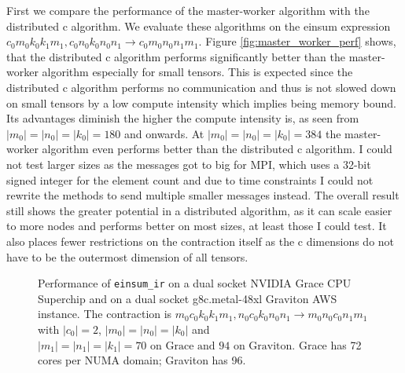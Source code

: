First we compare the performance of the master-worker algorithm with the distributed c algorithm.
We evaluate these algorithms on the einsum expression $c_0m_0k_0k_1m_1, c_0n_0k_0n_0n_1 \rightarrow c_0m_0n_0n_1m_1$.
Figure \ref{fig:master_worker_perf} shows, that the distributed c algorithm performs significantly better than the master-worker algorithm especially for small tensors.
This is expected since the distributed c algorithm performs no communication and thus is not slowed down on small tensors by a low compute intensity which implies being memory bound.
Its advantages diminish the higher the compute intensity is, as seen from $|m_0|=|n_0|=|k_0|= 180$ and onwards.
At $|m_0|=|n_0|=|k_0|= 384$ the master-worker algorithm even performs better than the distributed c algorithm.
I could not test larger sizes as the messages got to big for MPI, which uses a 32-bit signed integer for the element count and due to time constraints I could not rewrite the methods to send multiple smaller messages instead.
The overall result still shows the greater potential in a distributed algorithm, as it can scale easier to more nodes and performs better on most sizes, at least those I could test.
It also places fewer restrictions on the contraction itself as the c dimensions do not have to be the outermost dimension of all tensors.


\begin{figure}[ht]
  \caption{
    Performance of \texttt{einsum\_ir} on a dual socket NVIDIA Grace CPU Superchip and on a dual socket g8c.metal-48xl Graviton AWS instance.
    The contraction is $m_0c_0k_0k_1m_1, n_0c_0k_0n_0n_1 \rightarrow m_0n_0c_0n_1m_1$ with $|c_0|=2$, $|m_0|=|n_0|=|k_0|$ and $|m_1|=|n_1|=|k_1|=70\text{ on Grace and } 94\text{ on Graviton}$.
    Grace has 72 cores per NUMA domain; Graviton has 96.
    }
  \label{fig:einsum_ir_perf}
\end{figure}

